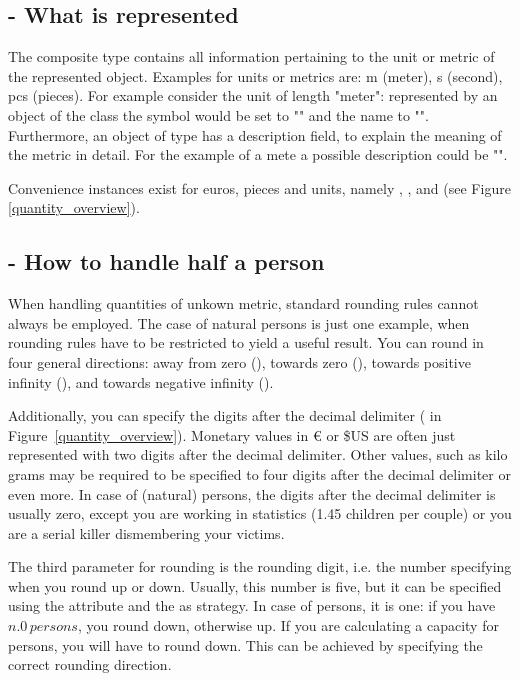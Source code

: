 \subsection{ - What is represented}
The composite type  contains all information pertaining to the unit or metric of the represented object.
Examples for units or metrics are: m (meter), s (second), pcs (pieces).
For example consider the unit of length "meter": represented by an object of the class  the symbol would be set to "" and the name to "".
Furthermore, an object of type  has a description field, to explain the meaning of the metric in detail.
For the example of a mete a possible description could be "".

Convenience instances exist for euros, pieces and units, namely , , and  (see Figure \ref{quantity_overview}).

\subsection{ - How to handle half a person}
When handling quantities of unkown metric, standard rounding rules cannot always be employed.
The case of natural persons is just one example, when rounding rules have to be restricted to yield a useful result.
You can round in four general directions: away from zero (), towards zero (), towards positive infinity (), and towards negative infinity ().

Additionally, you can specify the digits after the decimal delimiter ( in Figure~\ref{quantity_overview}).
Monetary values in \euro{} or \$US are often just represented with two digits after the decimal delimiter.
Other values, such as kilo grams may be required to be specified to four digits after the decimal delimiter or even more.
In case of (natural) persons, the digits after the decimal delimiter is usually zero, except you are working in statistics (1.45 children per couple) or you are a serial killer dismembering your victims.

The third parameter for rounding is the rounding digit, i.e. the number specifying when you round up or down.
Usually, this number is five, but it can be specified using the attribute  and the  as strategy.
In case of persons, it is one: if you have $n.0\,persons$, you round down, otherwise up.
If you are calculating a capacity for persons, you will have to round down.
This can be achieved by specifying the correct rounding direction.
\\

